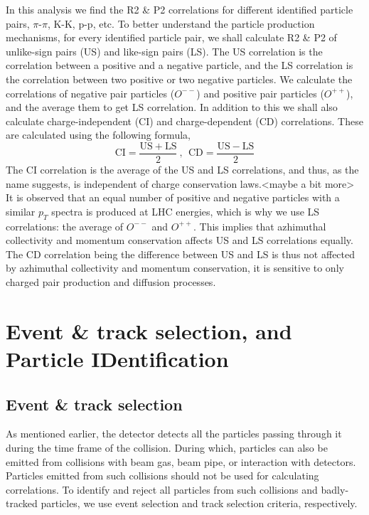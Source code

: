 \documentclass[12pt,a4paper,twoside]{report}
\begin{document}
In this analysis we find the R2 \& P2 correlations for different identified particle pairs, $\pi$-$\pi$, K-K, p-p, etc. To better understand the particle production mechanisms, for every identified particle pair, we shall calculate R2 \& P2 of unlike-sign pairs (US) and like-sign pairs (LS). The US correlation is the correlation between a positive and a negative particle, and the LS correlation is the correlation between two positive or two negative particles. We calculate the correlations of negative pair particles ($O^{--}$) and positive pair particles ($O^{++}$), and the average them to get LS correlation. In addition to this we shall also calculate charge-independent (CI) and charge-dependent (CD) correlations. These are calculated using the following formula,
\begin{equation*}
	\mathrm{CI}=\frac{\mathrm{US}+\mathrm{LS}}{2}\ , \ \ \mathrm{CD}=\frac{\mathrm{US}-\mathrm{LS}}{2}
\end{equation*}
The CI correlation is the average of the US and LS correlations, and thus, as the name suggests, is independent of charge conservation laws.<maybe a bit more>\\ 
It is observed that an equal number of positive and negative particles with a similar $p_T$ spectra is produced at LHC energies, which is why we use LS correlations: the average of $O^{--}$ and $O^{++}$. This implies that azhimuthal collectivity and momentum conservation affects US and LS correlations equally. The CD correlation being the difference between US and LS is thus not affected by azhimuthal collectivity and momentum conservation, it is sensitive to only charged pair production and diffusion processes.
\chapter{Event \& track selection, and Particle IDentification}\label{Ch:Selections}
\section{Event \& track selection}
As mentioned earlier, the detector detects all the particles passing through it during the time frame of the collision. During which, particles can also be emitted from collisions with beam gas, beam pipe, or interaction with detectors. Particles emitted from such collisions should not be used for calculating correlations. To identify and reject all particles from such collisions and badly-tracked particles, we use event selection and track selection criteria, respectively.\\ 
\end{document}
